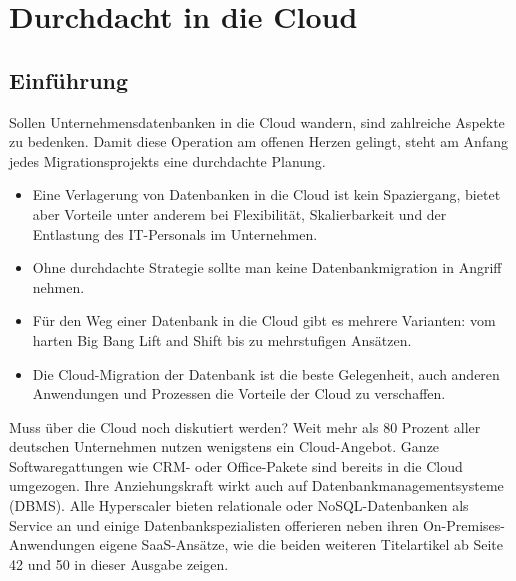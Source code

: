 %
%
%
%




\chapter{Durchdacht in die Cloud}

\section{Einführung}

Sollen Unternehmensdatenbanken in die Cloud wandern, sind zahlreiche Aspekte zu bedenken. Damit diese Operation am offenen Herzen gelingt, steht am Anfang jedes Migrationsprojekts eine durchdachte Planung.

\begin{itemize}
	\item Eine Verlagerung von Datenbanken in die Cloud ist kein Spaziergang, bietet aber Vorteile unter anderem bei Flexibilität, Skalierbarkeit und der Entlastung des IT-Personals im Unternehmen.
	\item Ohne durchdachte Strategie sollte man keine Datenbankmigration in Angriff nehmen.
	\item Für den Weg einer Datenbank in die Cloud gibt es mehrere Varianten: vom harten Big Bang Lift and Shift bis zu mehrstufigen Ansätzen.
	\item Die Cloud-Migration der Datenbank ist die beste Gelegenheit, auch anderen Anwendungen und Prozessen die Vorteile der Cloud zu verschaffen.
\end{itemize}


Muss über die Cloud noch diskutiert werden? Weit mehr als 80 Prozent aller deutschen Unternehmen nutzen wenigstens ein Cloud-Angebot. Ganze Softwaregattungen wie CRM- oder Office-Pakete sind bereits in die Cloud umgezogen. Ihre Anziehungskraft wirkt auch auf Datenbankmanagementsysteme (DBMS). Alle Hyperscaler bieten relationale oder NoSQL-Datenbanken als Service an und einige Datenbankspezialisten offerieren neben ihren On-Premises-Anwendungen eigene SaaS-Ansätze, wie die beiden weiteren Titelartikel ab Seite 42 und 50 in dieser Ausgabe zeigen.

